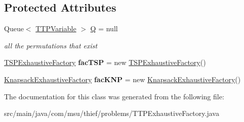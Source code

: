 \subsection*{Protected Attributes}
\begin{DoxyCompactItemize}
\item 
\hypertarget{classcom_1_1msu_1_1thief_1_1problems_1_1TTPExhaustiveFactory_ab950e5d6fec07671c9306c467816c946}{Queue$<$ \hyperlink{classcom_1_1msu_1_1thief_1_1variable_1_1TTPVariable}{T\-T\-P\-Variable} $>$ \hyperlink{classcom_1_1msu_1_1thief_1_1problems_1_1TTPExhaustiveFactory_ab950e5d6fec07671c9306c467816c946}{Q} = null}\label{classcom_1_1msu_1_1thief_1_1problems_1_1TTPExhaustiveFactory_ab950e5d6fec07671c9306c467816c946}

\begin{DoxyCompactList}\small\item\em all the permutations that exist \end{DoxyCompactList}\item 
\hypertarget{classcom_1_1msu_1_1thief_1_1problems_1_1TTPExhaustiveFactory_a1bb8f5a0cb4a48b603dd605290ed551f}{\hyperlink{classcom_1_1msu_1_1tsp_1_1TSPExhaustiveFactory}{T\-S\-P\-Exhaustive\-Factory} {\bfseries fac\-T\-S\-P} = new \hyperlink{classcom_1_1msu_1_1tsp_1_1TSPExhaustiveFactory}{T\-S\-P\-Exhaustive\-Factory}()}\label{classcom_1_1msu_1_1thief_1_1problems_1_1TTPExhaustiveFactory_a1bb8f5a0cb4a48b603dd605290ed551f}

\item 
\hypertarget{classcom_1_1msu_1_1thief_1_1problems_1_1TTPExhaustiveFactory_a368a3c57843610d488183ef7183f98fd}{\hyperlink{classcom_1_1msu_1_1knp_1_1KnapsackExhaustiveFactory}{Knapsack\-Exhaustive\-Factory} {\bfseries fac\-K\-N\-P} = new \hyperlink{classcom_1_1msu_1_1knp_1_1KnapsackExhaustiveFactory}{Knapsack\-Exhaustive\-Factory}()}\label{classcom_1_1msu_1_1thief_1_1problems_1_1TTPExhaustiveFactory_a368a3c57843610d488183ef7183f98fd}

\end{DoxyCompactItemize}


The documentation for this class was generated from the following file\-:\begin{DoxyCompactItemize}
\item 
src/main/java/com/msu/thief/problems/T\-T\-P\-Exhaustive\-Factory.\-java\end{DoxyCompactItemize}
